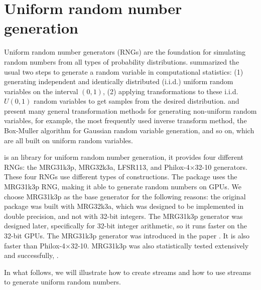 \documentclass[article,nojss]{jss}\usepackage[]{graphicx}\usepackage[]{color}
\begin{document}
\section{Uniform random number generation} \label{}
Uniform random number generators (RNGs) are the foundation for simulating random numbers from all types of probability distributions. \cite{l2012random} summarized the usual two steps to generate a random variable in computational statistics: (1) generating independent and identically distributed (i.i.d.) uniform random variables on the interval $(0, 1)$, (2) applying transformations to these i.i.d. $U(0, 1)$ random variables to get samples from the desired distribution. \cite{l2012random} and \cite{robert2004random} present many general transformation methods for generating non-uniform random variables, for example, the most frequently used inverse transform method, the Box-Muller algorithm \citep{box1958note} for Gaussian random variable generation, and so on, which are all built on uniform random variables. %


 is an  library for uniform random number generation, it provides four different RNGs: the MRG31k3p, MRG32k3a, LFSR113, and Philox-4×32-10 generators. These four RNGs use different types of constructions. The  package uses the MRG31k3p RNG, making it able to generate random numbers on GPUs. We choose MRG31k3p as the base generator for the following reasons:  the original  package \citep{l2002object} was built with MRG32k3a, which was designed to be implemented in double precision, and not with 32-bit integers. The MRG31k3p generator was designed later, specifically for 32-bit integer arithmetic, so it runs faster on the 32-bit GPUs. The MRG31k3p generator was introduced in the paper \citep{rLEC00b}. It is also faster than Philox-4×32-10. MRG31k3p was also statistically tested extensively and successfully, \cite[see][]{rLEC07b}.    




In what follows, we will illustrate how to create streams and how to use streams to generate uniform random numbers. 

\end{document}
